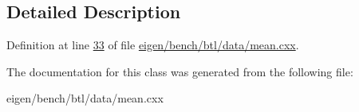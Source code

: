 \subsection{Detailed Description}


Definition at line \hyperlink{eigen_2bench_2btl_2data_2mean_8cxx_source_l00033}{33} of file \hyperlink{eigen_2bench_2btl_2data_2mean_8cxx_source}{eigen/bench/btl/data/mean.\+cxx}.



The documentation for this class was generated from the following file\+:\begin{DoxyCompactItemize}
\item 
eigen/bench/btl/data/mean.\+cxx\end{DoxyCompactItemize}
